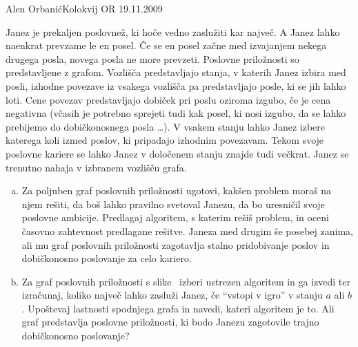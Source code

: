 \begin{naloga}{Alen Orbanić}{Kolokvij OR 19.11.2009}
\begin{vprasanje}
Janez je prekaljen poslovnež, ki hoče vedno zaslužiti kar največ.
A Janez lahko naenkrat prevzame le en posel.
Če se en posel začne med izvajanjem nekega drugega posla,
novega posla ne more prevzeti.
Poslovne priložnosti so predstavljene z grafom.
Vozlišča predstavljajo stanja, v katerih Janez izbira med posli,
izhodne povezave iz vsakega vozlišča pa predstavljajo posle,
ki se jih lahko loti.
Cene povezav predstavljajo dobiček pri poslu oziroma izgubo,
če je cena negativna
(včasih je potrebno sprejeti tudi kak posel, ki nosi izgubo,
da se lahko prebijemo do dobičkonosnega posla \dots).
V vsakem stanju lahko Janez izbere katerega koli izmed poslov,
ki pripadajo izhodnim povezavam.
Tekom svoje poslovne kariere se lahko Janez
v določenem stanju znajde tudi večkrat.
Janez se trenutno nahaja v izbranem vozlišču grafa.
\begin{enumerate}[(a)]
\item Za poljuben graf poslovnih priložnosti ugotovi,
kakšen problem moraš na njem rešiti, da boš lahko pravilno svetoval Janezu,
da bo uresničil svoje poslovne ambicije.
Predlagaj algoritem, s katerim rešiš problem,
in oceni časovno zahtevnost predlagane rešitve.
Janeza med drugim še posebej zanima,
ali mu graf poslovnih priložnosti zagotavlja stalno pridobivanje poslov
in dobičkonosno poslovanje za celo kariero.
\item Za graf poslovnih priložnosti s slike~\fig
izberi ustrezen algoritem in ga izvedi ter izračunaj,
koliko največ lahko zasluži Janez, če ``vstopi v igro'' v stanju $a$ ali $b$.
Upoštevaj lastnosti spodnjega grafa in navedi, kateri algoritem je to.
Ali graf predstavlja poslovne priložnosti,
ki bodo Janezu zagotovile trajno dobičkonosno poslovanje?
\end{enumerate}

\begin{slika}
\pgfslika
{}
\end{slika}
\end{vprasanje}


\end{naloga}
